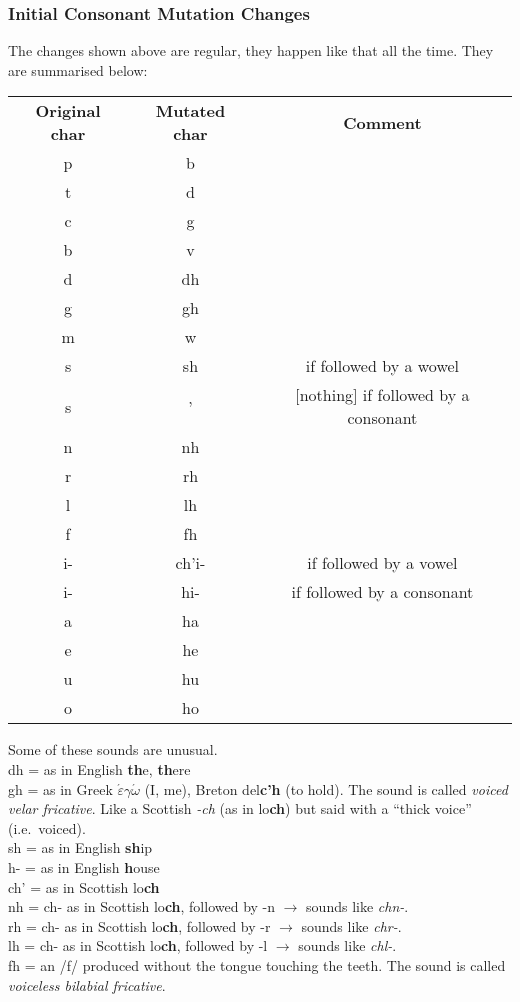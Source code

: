 \subsubsection{Initial Consonant Mutation Changes}
The changes shown above are regular, they happen like that all the time. They are summarised below:
\begin{table}[H]
\centering
\begin{tabular}{ccc}
  \toprule
  \textbf{Original char} & \textbf{Mutated char} & \textbf{Comment}\\
  \cmidrule(lr){1-1}\cmidrule(lr){2-2}\cmidrule(lr){3-3}
  p & b & \\
  t & d & \\
  c & g & \\
  b & v & \\
  d & dh & \\
  g & gh & \\
  m & w & \\
  s & sh & if followed by a wowel\\
  s & ' & $[$nothing$]$ if followed by a consonant\\
  n & nh & \\
  r & rh & \\
  l & lh & \\
  f & fh & \\
  i- & ch'i- & if followed by a vowel\\
  i- & hi- & if followed by a consonant\\
  a & ha & \\
  e & he & \\
  u & hu & \\
  o & ho & \\
  \bottomrule
\end{tabular}
\label{summary_mutated_chars}
\end{table}

Some of these sounds are unusual.\\
dh = as in English \textbf{th}e, \textbf{th}ere\\
gh = as in Greek $\acute{\varepsilon}$\textbf{$\gamma$}$\acute{\omega}$ (I, me), Breton del\textbf{c'h} (to hold). The sound is called \textit{voiced velar fricative}. Like a Scottish \textit{-ch} (as in lo\textbf{ch}) but said with a ``thick voice'' (i.e.\ voiced).\\
sh = as in English \textbf{sh}ip\\
h- = as in English \textbf{h}ouse\\
ch' = as in Scottish lo\textbf{ch}\\
nh = ch- as in Scottish lo\textbf{ch}, followed by -n $\rightarrow$ sounds like \textit{chn-}.\\
rh = ch- as in Scottish lo\textbf{ch}, followed by -r $\rightarrow$ sounds like \textit{chr-}.\\
lh = ch- as in Scottish lo\textbf{ch}, followed by -l $\rightarrow$ sounds like \textit{chl-}.\\
fh = an /f/ produced without the tongue touching the teeth. The sound is called \textit{voiceless bilabial fricative}.\\

